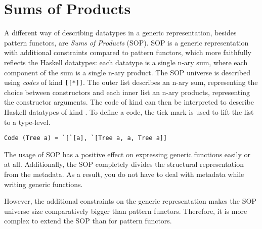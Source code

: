 \section{Sums of Products}
A different way of describing datatypes in a generic representation, besides pattern functors, are \textit{Sums of Products}\cite{vries2014sums} (SOP). SOP is a generic representation with additional constraints compared to pattern functors, which more faithfully reflects the Haskell datatypes: each datatype is a single n-ary sum, where each component of the sum is a single n-ary product. The SOP universe is described using \textit{codes} of kind \texttt{[[*]]}. The outer list describes an n-ary sum, representing the choice between constructors and each inner list an n-ary products, representing the constructor arguments.  The code of kind \inlinehaskell{[[*]]} can then be interpreted to describe Haskell datatypes of kind \inlinehaskell{*}. To define a code, the tick mark  is used to lift the list to a type-level. 

\begin{verbatim}
Code (Tree a) = `[`[a], `[Tree a, a, Tree a]]
\end{verbatim}

The usage of SOP has a positive effect on expressing generic functions easily or at all. Additionally, the SOP completely divides the structural representation from the metadata. As a result, you do not have to deal with metadata while writing generic functions. 

However, the additional constraints on the generic representation makes the SOP universe size comparatively bigger than pattern functors. Therefore, it is more complex to extend the SOP than for pattern functors.

